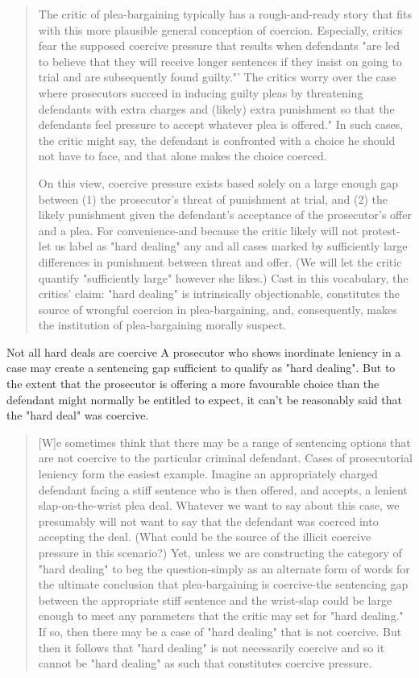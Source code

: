 \begin{quote}
    The critic of plea-bargaining typically has a rough-and-ready story that fits with this more plausible general conception of coercion. Especially, critics fear the supposed coercive pressure that results when defendants "are led to believe that they will receive longer sentences if they insist on going to trial and are subsequently found guilty."' The critics worry over the case where prosecutors succeed in inducing guilty pleas by threatening defendants with extra charges and (likely) extra punishment so that the defendants feel pressure to accept whatever plea is offered." In such cases, the critic might say, the defendant is confronted with a choice he should not have to face, and that alone makes the choice coerced.
    
    On this view, coercive pressure exists based solely on a large enough gap between (1) the prosecutor's threat of punishment at trial, and (2) the likely punishment given the defendant's acceptance of the prosecutor's offer and a plea. For convenience-and because the critic likely will not protest-let us label as "hard dealing" any and all cases marked by sufficiently large differences in punishment between threat and offer. (We will let the critic quantify "sufficiently large" however she likes.) Cast in this vocabulary, the critics' claim: "hard dealing" is intrinsically objectionable, constitutes the source of wrongful coercion in plea-bargaining, and, consequently, makes the institution of plea-bargaining morally suspect.
\end{quote}

Not all hard deals are coercive
A prosecutor who shows inordinate leniency in a case may create a sentencing gap sufficient to qualify as "hard dealing". But to the extent that the prosecutor is offering a more favourable choice than the defendant might normally be entitled to expect, it can't be reasonably said that the "hard deal" was coercive.

\begin{quote}
    [W]e sometimes think that there may be a range of sentencing options that are not coercive to the particular criminal defendant. Cases of prosecutorial leniency form the easiest example. Imagine an appropriately charged defendant facing a stiff sentence who is then offered, and accepts, a lenient slap-on-the-wrist plea deal. Whatever we want to say about this case, we presumably will not want to say that the defendant was coerced into accepting the deal. (What could be the source of the illicit coercive pressure in this scenario?) Yet, unless we are constructing the category of "hard dealing" to beg the question-simply as an alternate form of words for the ultimate conclusion that plea-bargaining is coercive-the sentencing gap between the appropriate stiff sentence and the wrist-slap could be large enough to meet any parameters that the critic may set for "hard dealing." If so, then there may be a case of "hard dealing" that is not coercive. But then it follows that "hard dealing" is not necessarily coercive and so it cannot be "hard dealing" as such that constitutes coercive pressure.
\end{quote}




